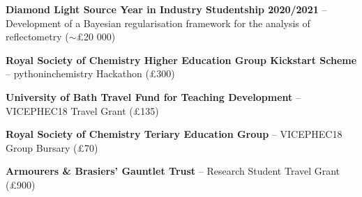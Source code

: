 \begin{cventriesy}
  \cventryy
    {
      \begin{cvitems}
        \item {\textbf{Diamond Light Source Year in Industry Studentship 2020/2021} -- Development of a Bayesian regularisation framework for the analysis of reflectometry ($\sim$£20 000)}
    \vspace{1mm}
        \item {\textbf{Royal Society of Chemistry Higher Education Group Kickstart Scheme} -- pythoninchemistry Hackathon (£300)}
    \vspace{1mm}
        \item {\textbf{University of Bath Travel Fund for Teaching Development} -- VICEPHEC18 Travel Grant (£135)}
    \vspace{1mm}
        \item {\textbf{Royal Society of Chemistry Teriary Education Group} -- VICEPHEC18 Group Bursary (£70)}
    \vspace{1mm}
        \item {\textbf{Armourers \& Brasiers’ Gauntlet Trust} -- Research Student Travel Grant (£900)}
      \end{cvitems}
    }
\end{cventriesy}